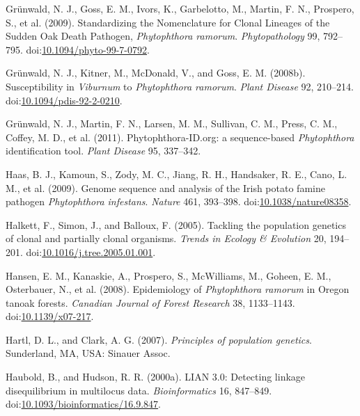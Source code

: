 \documentclass[double,12pt]{beavtex}
\begin{document}
  \hypertarget{ref-grunwald2009standardizing}{}
  Grünwald, N. J., Goss, E. M., Ivors, K., Garbelotto, M., Martin, F. N.,
  Prospero, S., et al. (2009). Standardizing the Nomenclature for Clonal
  Lineages of the Sudden Oak Death Pathogen, \emph{Phytophthora ramorum}.
  \emph{Phytopathology} 99, 792--795.
  doi:\href{https://doi.org/10.1094/phyto-99-7-0792}{10.1094/phyto-99-7-0792}.
  
  \hypertarget{ref-grunwald2008susceptibility}{}
  Grünwald, N. J., Kitner, M., McDonald, V., and Goss, E. M. (2008b).
  Susceptibility in \emph{Viburnum} to \emph{Phytophthora ramorum}.
  \emph{Plant Disease} 92, 210--214.
  doi:\href{https://doi.org/10.1094/pdis-92-2-0210}{10.1094/pdis-92-2-0210}.
  
  \hypertarget{ref-grunwald2011phytophthora}{}
  Grünwald, N. J., Martin, F. N., Larsen, M. M., Sullivan, C. M., Press,
  C. M., Coffey, M. D., et al. (2011). Phytophthora-ID.org: a
  sequence-based \emph{Phytophthora} identification tool. \emph{Plant
  Disease} 95, 337--342.
  
  \hypertarget{ref-haas2009genome}{}
  Haas, B. J., Kamoun, S., Zody, M. C., Jiang, R. H., Handsaker, R. E.,
  Cano, L. M., et al. (2009). Genome sequence and analysis of the Irish
  potato famine pathogen \emph{Phytophthora infestans}. \emph{Nature} 461,
  393--398.
  doi:\href{https://doi.org/10.1038/nature08358}{10.1038/nature08358}.
  
  \hypertarget{ref-halkett2005tackling}{}
  Halkett, F., Simon, J., and Balloux, F. (2005). Tackling the population
  genetics of clonal and partially clonal organisms. \emph{Trends in
  Ecology \& Evolution} 20, 194--201.
  doi:\href{https://doi.org/10.1016/j.tree.2005.01.001}{10.1016/j.tree.2005.01.001}.
  
  \hypertarget{ref-hansen2008epidemiology}{}
  Hansen, E. M., Kanaskie, A., Prospero, S., McWilliams, M., Goheen, E.
  M., Osterbauer, N., et al. (2008). Epidemiology of \emph{Phytophthora
  ramorum} in Oregon tanoak forests. \emph{Canadian Journal of Forest
  Research} 38, 1133--1143.
  doi:\href{https://doi.org/10.1139/x07-217}{10.1139/x07-217}.
  
  \hypertarget{ref-hartl1997principles}{}
  Hartl, D. L., and Clark, A. G. (2007). \emph{Principles of population
  genetics}. Sunderland, MA, USA: Sinauer Assoc.
  
  \hypertarget{ref-haubold2000lian}{}
  Haubold, B., and Hudson, R. R. (2000a). LIAN 3.0: Detecting linkage
  disequilibrium in multilocus data. \emph{Bioinformatics} 16, 847--849.
  doi:\href{https://doi.org/10.1093/bioinformatics/16.9.847}{10.1093/bioinformatics/16.9.847}.
  
\end{document}
